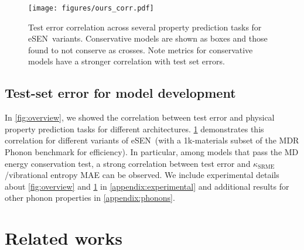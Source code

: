 \documentclass[twocolumn]{fairmeta}
\newcommand{\ourmodel}{eSEN}
\begin{document}
\begin{figure}[t]
\texttt{[image: figures/ours\_corr.pdf]}
\caption{ Test error correlation across several property prediction tasks for \ourmodel\ variants. Conservative models are shown as boxes and those found to not conserve as crosses. Note metrics for conservative models have a stronger correlation with test set errors.}
\label{fig:test_error_dev}
\end{figure}

\subsection{Test-set error for model development}

In \cref{fig:overview}, we showed the correlation between test error and physical property prediction tasks for different architectures. \cref{fig:test_error_dev} demonstrates this correlation for different variants of \ourmodel\ (with a 1k-materials subset of the MDR Phonon benchmark for efficiency). In particular, among models that pass the MD energy conservation test, a strong correlation between test error and $\kappa_{\mathrm{SRME}}$/vibrational entropy MAE can be observed. 
We include experimental details about \cref{fig:overview} and \cref{fig:test_error_dev} in \cref{appendix:experimental} and additional results for other phonon properties in \cref{appendix:phonons}.

\section{Related works}
\end{document}
